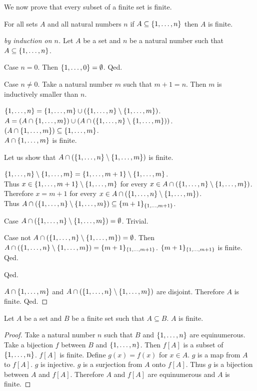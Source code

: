 \documentclass{article}
\begin{document}
%
We now prove that every subset of a finite set is finite.
%
\begin{forthel}

\begin{lemma}
	For all sets $A$ and all natural numbers $n$ if $A \subseteq \{1,\dots,n\}$ then $A$ is finite.
\end{lemma}

\begin{proof}[by induction on $n$]
	Let $A$ be a set and $n$ be a natural number such that $A \subseteq \{1,\dots,n\}$.
	
	Case $n=0$. Then $\{1,\dots,0\} = \emptyset$. Qed.
	
	Case $n \neq 0$. Take a natural number $m$ such that $m+1=n$. 
	Then $m$ is inductively smaller than $n$. 
	
	$\{1,\dots,n\} = \{1,\dots,m\} \cup (\{1,\dots,n\} \setminus \{1,\dots,m\})$.\\
	$A = (A \cap \{1,\dots,m\}) \cup (A\cap (\{1,\dots,n\} \setminus \{1,\dots,m\}))$.\\
	$(A \cap \{1,\dots,m\}) \subseteq \{1,\dots,m\}$.\\
	$A \cap \{1,\dots,m\}$ is finite.
	
	Let us show that $A\cap (\{1,\dots,n\} \setminus \{1,\dots,m\})$ is finite.
	
	$\{1,\dots,n\} \setminus \{1,\dots,m\} = \{1,\dots,m+1\} \setminus \{1,\dots,m\}$.\\
	Thus $x \in \{1,\dots,m+1\} \setminus \{1,\dots,m\}$ for every $x \in A\cap (\{1,\dots,n\} \setminus \{1,\dots,m\})$.\\
	Therefore $x = m+1$ for every $x \in A\cap (\{1,\dots,n\} \setminus \{1,\dots,m\})$.\\
	Thus $A\cap (\{1,\dots,n\} \setminus \{1,\dots,m\}) \subseteq \{m+1\}_{\{1,\dots,m+1\}}$.
	
	Case $A\cap (\{1,\dots,n\} \setminus \{1,\dots,m\}) = \emptyset$. Trivial.
	
	Case not $A\cap (\{1,\dots,n\} \setminus \{1,\dots,m\}) = \emptyset$.
	Then $A\cap (\{1,\dots,n\} \setminus \{1,\dots,m\}) = \{m+1\}_{\{1,\dots,m+1\}}$.
	$\{m+1\}_{\{1,\dots,m+1\}}$ is finite.
	Qed.
	
	Qed.
	
	$A \cap \{1,\dots,m\}$ and $A\cap (\{1,\dots,n\} \setminus \{1,\dots,m\})$ are disjoint.
	Therefore $A$ is finite.
	Qed.
\end{proof}

\begin{lemma}
	Let $A$ be a set and $B$ be a finite set such that $A \subseteq B$.
	$A$ is finite.
\end{lemma}
\begin{proof}
	Take a natural number $n$ such that $B$ and $\{1,\dots,n\}$ are equinumerous.
	Take a bijection $f$ between $B$ and $\{1,\dots,n\}$.
	Then $f[A]$ is a subset of $\{1,\dots,n\}$.
	$f[A]$ is finite.
	Define $g(x) = f(x)$ for $x\in A$.
	$g$ is a map from $A$ to $f[A]$.
	$g$ is injective.
	$g$ is a surjection from $A$ onto $f[A]$.
	Thus $g$ is a bijection between $A$ and $f[A]$.
	Therefore $A$ and $f[A]$ are equinumerous and $A$ is finite.
\end{proof}


\end{forthel}
\end{document}
